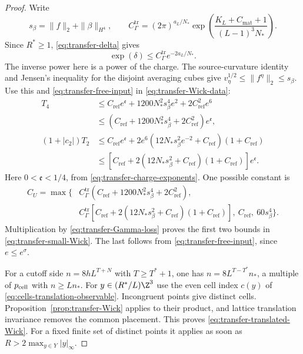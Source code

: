 \begin{proof}
Write
\[
 s_\beta=\|f\|_2+\|\beta\|_{H^4},\qquad
 C_\Gamma^{\mathrm{tr}}=(2\pi)^{a_L/N_*}
         \exp\left(\frac{K_L+C_{\mathrm{mat}}+1}
                                  {(L-1)^3N_*}\right).
\]
Since $R^*\ge1$, \eqref{eq:transfer-delta} gives
\begin{equation}\label{eq:transfer-Gamma-loss}
 \exp(\delta)\le C_\Gamma^{\mathrm{tr}} e^{-2a_L/N_*}.
\end{equation}
The inverse power here is a power of the charge.
The source-curvature identity and Jensen's inequality
for the disjoint averaging cubes give
$v_\eta^{1/2}\le\|f^\eta\|_2\le s_\beta$.
Use this and \eqref{eq:transfer-free-input} in
\eqref{eq:transfer-Wick-data}:
\begin{align*}
 T_4
 &\le C_{\mathrm{ref}} e^{\mathfrak e}
           +1200N_*^2s_\beta^4e^2+2C_{\mathrm{ref}}^2e^6\\
 &\le(C_{\mathrm{ref}}+1200N_*^2s_\beta^4+2C_{\mathrm{ref}}^2)e^{\mathfrak e},\\
 (1+|c_2|)T_2
 &\le C_{\mathrm{ref}} e^{\mathfrak e}
      +2e^6(12N_*s_\beta^2e^{-2}+C_{\mathrm{ref}})(1+C_{\mathrm{ref}})\\
 &\le[C_{\mathrm{ref}}+2(12N_*s_\beta^2+C_{\mathrm{ref}})(1+C_{\mathrm{ref}})]
                                                    e^{\mathfrak e}.
\end{align*}
Here $0<\mathfrak e<1/4$, from
\eqref{eq:transfer-charge-exponents}.
One possible constant is
\begin{equation}\label{eq:transfer-CU}
 \begin{split}
 C_U=\max\{&
 C_\Gamma^{\mathrm{tr}}(C_{\mathrm{ref}}+1200N_*^2s_\beta^4+2C_{\mathrm{ref}}^2),\\
 &C_\Gamma^{\mathrm{tr}}[C_{\mathrm{ref}}+2(12N_*s_\beta^2+C_{\mathrm{ref}})(1+C_{\mathrm{ref}})],
              \ C_{\mathrm{ref}},\ 60s_\beta^4\}.
 \end{split}
\end{equation}
Multiplication by \eqref{eq:transfer-Gamma-loss}
proves the first two bounds in
\eqref{eq:transfer-small-Wick}. The last follows from
\eqref{eq:transfer-free-input}, since $e\le e^\sigma$.

For a cutoff side $n=8hL^{T+N}$ with $T\ge T^*+1$,
one has $n=8L^{T-T^*}n_*$, a multiple of $p_{\rm cell}$ with
$n\ge Ln_*$. For $y\in(R^*/L)\Z^3$ use the even
cell index $c(y)$ of
\eqref{eq:cells-translation-observable}.
Incongruent points give distinct cells.
Proposition~\ref{prop:transfer-Wick} applies to their
product, and lattice translation invariance removes
the common placement. This proves
\eqref{eq:transfer-translated-Wick}.
For a fixed finite set of distinct points it applies
as soon as $R>2\max_{y\in Y}|y|_\infty$.


\end{proof}
